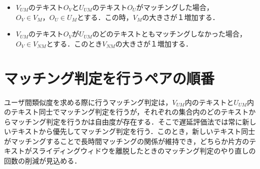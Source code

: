 \begin{itemize}
    \item $V_{UM}$のテキスト$O_V$と$U_{UM}$のテキスト$O_U$がマッチングした場合，$O_V \in V_M，O_U \in U_M$とする．この時，$V_M$の大きさが１増加する．
    \item $V_{UM}$のテキスト$O_V$が$U_{UM}$のどのテキストともマッチングしなかった場合，$O_V \in V_{NM}$とする．このとき$V_{NM}$の大きさが１増加する．
\end{itemize}




\section{マッチング判定を行うペアの順番}
\label{order_matching}
ユーザ間類似度を求める際に行うマッチング判定は，$V_{UM}$内のテキストと$U_{UM}$内のテキスト同士でマッチング判定を行うが，それぞれの集合内のどのテキストからマッチング判定を行うかは自由度が存在する．そこで遅延評価法では常に新しいテキストから優先してマッチング判定を行う．このとき，新しいテキスト同士がマッチングすることで長時間マッチングの関係が維持でき，どちらか片方のテキストがスライディングウィドウを離脱したときのマッチング判定のやり直しの回数の削減が見込める．

